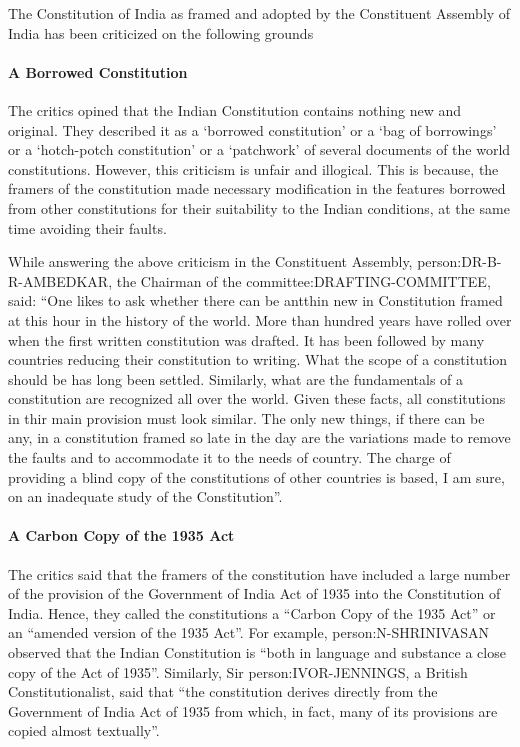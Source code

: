 \begin{multicol}{2}
The Constitution of India as framed and adopted by the Constituent Assembly of India has been criticized on the following grounds

\paragraph{A Borrowed Constitution}

The critics opined that the Indian Constitution contains nothing new and original. They described it as a `borrowed constitution' or a `bag of borrowings' or a `hotch-potch constitution' or a `patchwork' of several documents of the world constitutions. However, this criticism is unfair and illogical. This is because, the framers of the constitution made necessary modification in the features borrowed from other constitutions for their suitability to the Indian conditions, at the same time avoiding their faults.

While answering the above criticism in the Constituent Assembly, \gls{person:DR-B-R-AMBEDKAR}, the Chairman of the \gls{committee:DRAFTING-COMMITTEE}, said: ``One likes to ask whether there can be antthin new in Constitution framed at this hour in the history of the world. More than hundred years have rolled over when the first written constitution was drafted. It has been followed by many countries reducing their constitution to writing. What the scope of a constitution should be has long been settled. Similarly, what are the fundamentals of a constitution are recognized all over the world. Given these facts, all constitutions in thir main provision must look similar. The only new things, if there can be any, in a constitution framed so late in the day are the variations made to remove the faults and to accommodate it to the needs of country. The charge of providing a blind copy of the constitutions of other countries is based, I am sure, on an inadequate study of the Constitution''.

\paragraph{A Carbon Copy of the 1935 Act}

The critics said that the framers of the constitution have included a large number of the provision of the Government of India Act of 1935 into the Constitution of India. Hence, they called the constitutions a ``Carbon Copy of the 1935 Act'' or an ``amended version of the 1935 Act''. For example, \gls{person:N-SHRINIVASAN} observed that the Indian Constitution is ``both in language and substance a close copy of the Act of 1935''. Similarly, Sir \gls{person:IVOR-JENNINGS}, a British Constitutionalist, said that ``the constitution derives directly from the Government of India Act of 1935 from which, in fact, many of its provisions are copied almost textually''.


\end{multicol}
